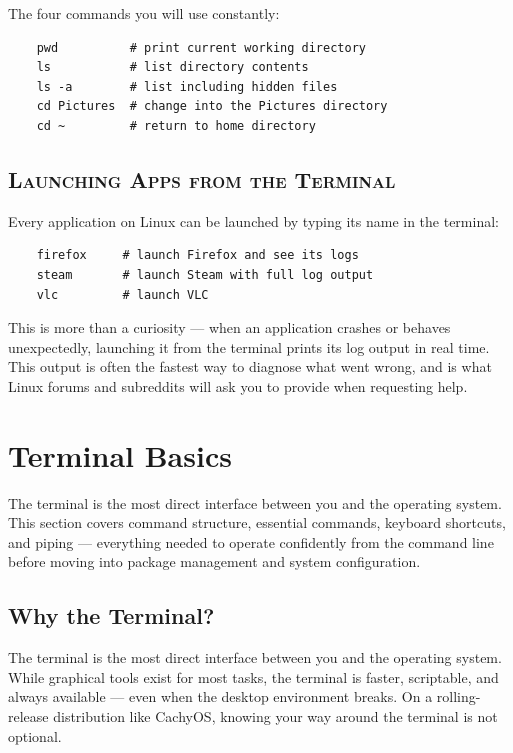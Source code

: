 \documentclass{article}
\begin{document}
The four commands you will use constantly:

\begin{verbatim}
	pwd          # print current working directory
	ls           # list directory contents
	ls -a        # list including hidden files
	cd Pictures  # change into the Pictures directory
	cd ~         # return to home directory
\end{verbatim}


\subsection{\textsc{Launching Apps from the Terminal}}

Every application on Linux can be launched by typing its name in the terminal:

\begin{verbatim}
	firefox     # launch Firefox and see its logs
	steam       # launch Steam with full log output
	vlc         # launch VLC
\end{verbatim}

This is more than a curiosity --- when an application crashes or behaves unexpectedly,
launching it from the terminal prints its log output in real time. This output is
often the fastest way to diagnose what went wrong, and is what Linux forums and
subreddits will ask you to provide when requesting help.
\newpage
\section{Terminal Basics}

The terminal is the most direct interface between you and the operating system. This
section covers command structure, essential commands, keyboard shortcuts, and piping
--- everything needed to operate confidently from the command line before moving into
package management and system configuration.

\subsection{Why the Terminal?}

The terminal is the most direct interface between you and the operating system. While
graphical tools exist for most tasks, the terminal is faster, scriptable, and always
available --- even when the desktop environment breaks. On a rolling-release
distribution like CachyOS, knowing your way around the terminal is not optional.
\end{document}
